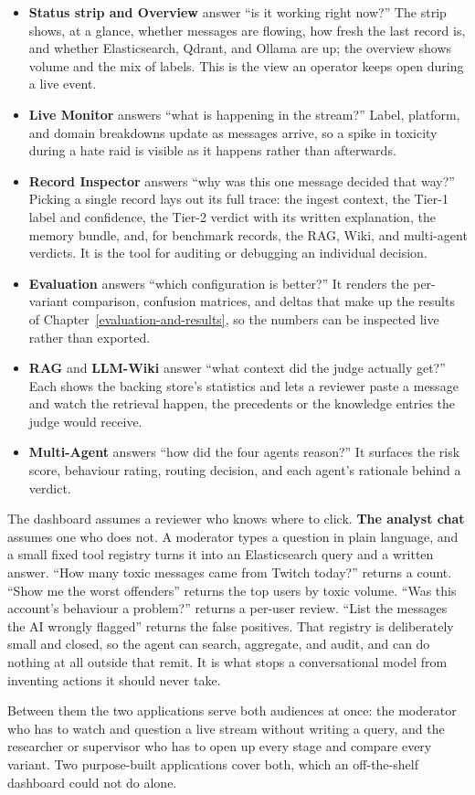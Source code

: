 \begin{itemize}
\tightlist
\item \textbf{Status strip and Overview} answer ``is it working right now?'' The strip shows, at a glance, whether messages are flowing, how fresh the last record is, and whether Elasticsearch, Qdrant, and Ollama are up; the overview shows volume and the mix of labels. This is the view an operator keeps open during a live event.
\item \textbf{Live Monitor} answers ``what is happening in the stream?'' Label, platform, and domain breakdowns update as messages arrive, so a spike in toxicity during a hate raid is visible as it happens rather than afterwards.
\item \textbf{Record Inspector} answers ``why was this one message decided that way?'' Picking a single record lays out its full trace: the ingest context, the Tier-1 label and confidence, the Tier-2 verdict with its written explanation, the memory bundle, and, for benchmark records, the RAG, Wiki, and multi-agent verdicts. It is the tool for auditing or debugging an individual decision.
\item \textbf{Evaluation} answers ``which configuration is better?'' It renders the per-variant comparison, confusion matrices, and deltas that make up the results of Chapter~\ref{evaluation-and-results}, so the numbers can be inspected live rather than exported.
\item \textbf{RAG} and \textbf{LLM-Wiki} answer ``what context did the judge actually get?'' Each shows the backing store's statistics and lets a reviewer paste a message and watch the retrieval happen, the precedents or the knowledge entries the judge would receive.
\item \textbf{Multi-Agent} answers ``how did the four agents reason?'' It surfaces the risk score, behaviour rating, routing decision, and each agent's rationale behind a verdict.
\end{itemize}

The dashboard assumes a reviewer who knows where to click. \textbf{The analyst chat} assumes one who does not. A moderator types a question in plain language, and a small fixed tool registry turns it into an Elasticsearch query and a written answer. ``How many toxic messages came from Twitch today?'' returns a count. ``Show me the worst offenders'' returns the top users by toxic volume. ``Was this account's behaviour a problem?'' returns a per-user review. ``List the messages the AI wrongly flagged'' returns the false positives. That registry is deliberately small and closed, so the agent can search, aggregate, and audit, and can do nothing at all outside that remit. It is what stops a conversational model from inventing actions it should never take.

Between them the two applications serve both audiences at once: the moderator who has to watch and question a live stream without writing a query, and the researcher or supervisor who has to open up every stage and compare every variant. Two purpose-built applications cover both, which an off-the-shelf dashboard could not do alone.
